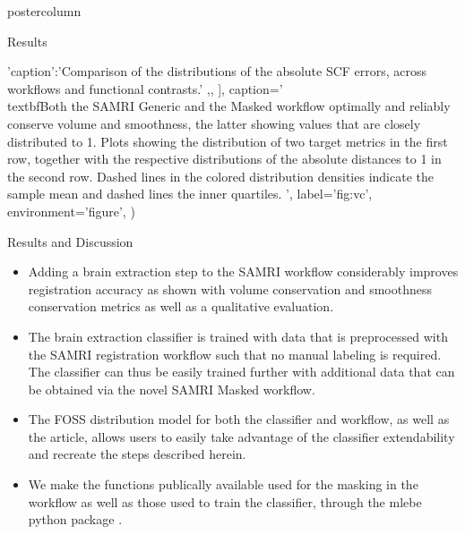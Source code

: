 \begin{frame}
\begin{columns}
\begin{column}{.59\textwidth}
\begin{beamercolorbox}[center]{postercolumn}
\begin{minipage}{.98\textwidth}
{\begin{myblock}{Results}
\begin{sansmath}
{{                                        'caption':'Comparison of the distributions of the absolute SCF errors, across workflows and functional contrasts.'
                                        ,},
                                        ],
                                        caption='\\textbf{Both the SAMRI Generic and the Masked workflow optimally and reliably conserve volume and smoothness, the latter showing values that are closely distributed to 1.}
                                        Plots showing the distribution of two target metrics in the first row, together with the respective distributions of the absolute distances to 1 in the second row. Dashed lines in the colored distribution densities indicate the sample mean and dashed lines the inner quartiles.
                                        ',
                                        label='fig:vc',
                                        environment='figure',
                                        )}
                                \end{sansmath}
                            \end{myblock}

                            \begin{myblock}{Results and Discussion}
                                \begin{itemize}
                                    \item Adding a brain extraction step to the SAMRI workflow considerably improves registration accuracy as shown with volume conservation and smoothness conservation metrics as well as a qualitative evaluation.
                                    \item The brain extraction classifier is trained with data that is preprocessed with the SAMRI registration workflow such that no manual labeling is required.
                                    The classifier can thus be easily trained further with additional data that can be obtained via the novel SAMRI Masked workflow.
                                    \item The FOSS distribution model for both the classifier and workflow, as well as the article, allows users to easily take advantage of the classifier extendability and recreate the steps described herein.
                                    \item We make the functions publically available used for the masking in the workflow as well as those used to train the classifier, through the \textcolor{mg}{mlebe} python package \cite{mlebe}.


\end{itemize}
\end{myblock}}
\end{minipage}
\end{beamercolorbox}
\end{column}
\end{columns}
\end{frame}
